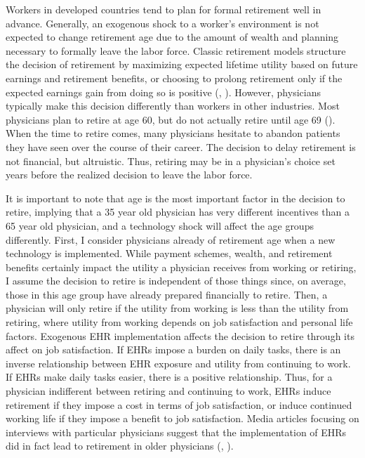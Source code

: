 \documentclass[12pt]{article}
\begin{document}
Workers in developed countries tend to plan for formal retirement well in advance. Generally, an exogenous shock to a worker's environment is not expected to change retirement age due to the amount of wealth and planning necessary to formally leave the labor force. Classic retirement models structure the decision of retirement by maximizing expected lifetime utility based on future earnings and retirement benefits, or choosing to prolong retirement only if the expected earnings gain from doing so is positive (\cite{gustman1986disaggregated}, \cite{stock1990pension}). However, physicians typically make this decision differently than workers in other industries. Most physicians plan to retire at age 60, but do not actually retire until age 69 (\cite{collier2017challenges}). When the time to retire comes, many physicians hesitate to abandon patients they have seen over the course of their career. The decision to delay retirement is not financial, but altruistic. Thus, retiring may be in a physician's choice set years before the realized decision to leave the labor force. 

It is important to note that age is the most important factor in the decision to retire, implying that a 35 year old physician has very different incentives than a 65 year old physician, and a technology shock will affect the age groups differently. First, I consider physicians already of retirement age when a new technology is implemented. While payment schemes, wealth, and retirement benefits certainly impact the utility a physician receives from working or retiring, I assume the decision to retire is independent of those things since, on average, those in this age group have already prepared financially to retire. Then, a physician will only retire if the utility from working is less than the utility from retiring, where utility from working depends on job satisfaction and personal life factors. Exogenous EHR implementation affects the decision to retire through its affect on job satisfaction. If EHRs impose a burden on daily tasks, there is an inverse relationship between EHR exposure and utility from continuing to work. If EHRs make daily tasks easier, there is a positive relationship. Thus, for a physician indifferent between retiring and continuing to work, EHRs induce retirement if they impose a cost in terms of job satisfaction, or induce continued working life if they impose a benefit to job satisfaction. Media articles focusing on interviews with particular physicians suggest that the implementation of EHRs did in fact lead to retirement in older physicians (\cite{ringel_2019}, \cite{loria_2020}). 
\end{document}

